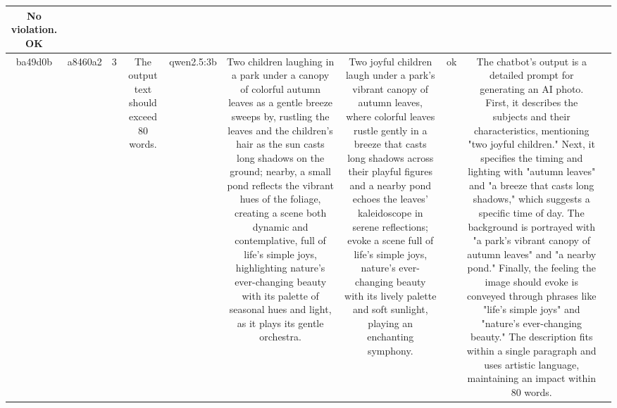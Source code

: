 \begin{table}[h!]
\begin{tabular}{|c|c|c|c|c|c|c|c|c|c|}
No violation.
OK & \\
\hline
ba49d0b & a8460a2 & 3 & The output text should exceed 80 words. & qwen2.5:3b & Two children laughing in a park under a canopy of colorful autumn leaves as a gentle breeze sweeps by, rustling the leaves and the children's hair as the sun casts long shadows on the ground; nearby, a small pond reflects the vibrant hues of the foliage, creating a scene both dynamic and contemplative, full of life's simple joys, highlighting nature's ever-changing beauty with its palette of seasonal hues and light, as it plays its gentle orchestra. & Two joyful children laugh under a park’s vibrant canopy of autumn leaves, where colorful leaves rustle gently in a breeze that casts long shadows across their playful figures and a nearby pond echoes the leaves’ kaleidoscope in serene reflections; evoke a scene full of life's simple joys, nature’s ever-changing beauty with its lively palette and soft sunlight, playing an enchanting symphony. & ok & The chatbot's output is a detailed prompt for generating an AI photo. First, it describes the subjects and their characteristics, mentioning "two joyful children." Next, it specifies the timing and lighting with "autumn leaves" and "a breeze that casts long shadows," which suggests a specific time of day. The background is portrayed with "a park’s vibrant canopy of autumn leaves" and "a nearby pond." Finally, the feeling the image should evoke is conveyed through phrases like "life's simple joys" and "nature’s ever-changing beauty." The description fits within a single paragraph and uses artistic language, maintaining an impact within 80 words. 


\end{tabular}
\end{table}
